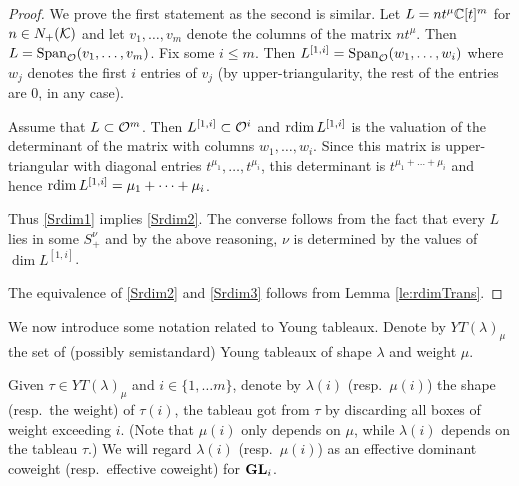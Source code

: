 \documentclass{article} %
\begin{document}
\begin{proof}
We prove the first statement as the second is similar.  Let $ L = n t^\mu \mathbb C[t]^m$ for $ n \in N_+(\mathcal K)$ and let $ v_1, \dots, v_m $ denote the columns of the matrix $ nt^\mu$.  Then $ L = \operatorname{Span}_{\mathcal O}(v_1, \dots, v_m)$.  Fix some $ i \le m$.  Then $ L^{[1,i]} = \operatorname{Span}_{\mathcal O}(w_1, \dots, w_i) $ where $ w_j $ denotes the first $ i $ entries of $ v_j $ (by upper-triangularity, the rest of the entries are 0, in any case).  

Assume that $L \subset \mathcal O^m$.  Then $ L^{[1,i]} \subset \mathcal O^i$ and $ \operatorname{rdim} L^{[1,i]} $ is the valuation of the determinant of the matrix with columns $ w_1, \dots, w_i$.  Since this matrix is upper-triangular with diagonal entries $ t^{\mu_1}, \dots, t^{\mu_i}$, this determinant is $ t^{\mu_1 + \dots + \mu_i} $ and hence $ \operatorname{rdim} L^{[1,i]} = \mu_1 + \dots + \mu_i$.   

Thus \ref{Srdim1} implies \ref{Srdim2}.  The converse follows from the fact that every $ L$ lies in some $ S_+^\nu$ and by the above reasoning, $ \nu$ is determined by the values of $ \dim L^{[1,i]}$.

The equivalence of \ref{Srdim2} and \ref{Srdim3} follows from Lemma \ref{le:rdimTrans}.
\end{proof}


We now introduce some notation related to Young tableaux. Denote by $YT(\lambda)_\mu$ the set of (possibly semistandard) Young tableaux of shape $\lambda$ and weight $\mu$. 

Given $\tau\in YT(\lambda)_\mu$ and $ i \in \{1, \dots m\} $, denote by $\lambda(i)$ (resp.\ $\mu(i)$) the shape (resp.\ the weight) of $\tau(i)$, the tableau got from $\tau$ by discarding all boxes of weight exceeding $i$. (Note that $ \mu(i)$ only depends on $ \mu$, while $ \lambda(i)$ depends on the tableau $ \tau$.)  We will regard $ \lambda(i)$ (resp.\ $\mu(i)$) as an effective dominant coweight (resp.\ effective coweight) for ${\mathbf{GL}}_i$. 
% 
\end{document}
